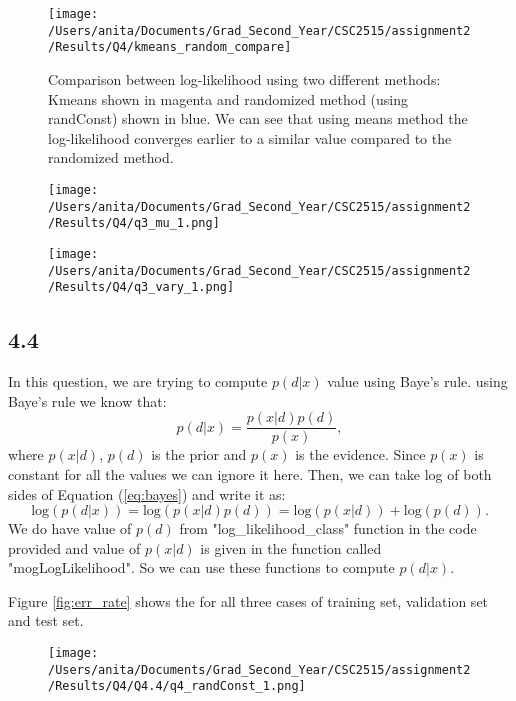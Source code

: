 \documentclass[10pt]{article}
\begin{document}
\begin{figure}[H]
	\centering
	\texttt{[image: /Users/anita/Documents/Grad\_Second\_Year/CSC2515/assignment2/Results/Q4/kmeans\_random\_compare]}
	\caption{Comparison between log-likelihood using two different methods: Kmeans shown in magenta and randomized method (using randConst) shown in blue.
	We can see that using means method the log-likelihood converges earlier to a similar value compared to the randomized method.}
	\label{fig:q4.3_logL}
\end{figure}


\begin{figure}[H]
	\centering
	\texttt{[image: /Users/anita/Documents/Grad\_Second\_Year/CSC2515/assignment2/Results/Q4/q3\_mu\_1.png]}
	\caption{}
	\label{fig:q4.3_mu}
\end{figure}


\begin{figure}[H]
	\centering
	\texttt{[image: /Users/anita/Documents/Grad\_Second\_Year/CSC2515/assignment2/Results/Q4/q3\_vary\_1.png]}
	\caption{}
	\label{fig:q4.3_mu}
\end{figure}

\subsection*{4.4}
In this question, we are trying to compute $p(d|x)$ value using Baye's rule. using Baye's rule we know that:
\begin{equation}\label{eq:bayes}
p(d|x) = \frac{p(x|d) p(d)}{p(x)},
\end{equation}
where $p(x|d)$, $p(d)$ is the prior and $p(x)$ is the evidence. Since $p(x)$ is constant for all the values we can ignore it here. Then, we can take log of both sides of Equation (\ref{eq:bayes}) and write it as:
\begin{equation}
\mathrm{log} (p(d|x)) = \mathrm{log}(p(x|d) p(d)) = \mathrm{log}(p(x|d)) + \mathrm{log}(p(d)).
\end{equation} 
We do have value of $p(d)$ from "log\_likelihood\_class" function in the code provided and value of $p(x|d)$ is given in the function called "mogLogLikelihood". So we can use these functions to compute $p(d|x)$.

Figure \ref{fig:err_rate} shows the for all three cases of training set, validation set and test set.
\begin{figure}[H]
	\centering
	\texttt{[image: /Users/anita/Documents/Grad\_Second\_Year/CSC2515/assignment2/Results/Q4/Q4.4/q4\_randConst\_1.png]}
	\caption{}
	\label{fig:q4.4}
\end{figure}
\end{document}
